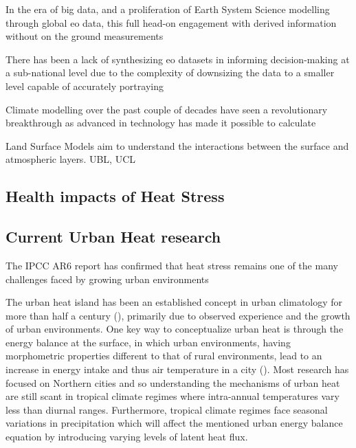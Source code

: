 In the era of big data, and a proliferation of Earth System Science modelling through global \Gls{eo} data, this full head-on engagement with derived information without on the ground measurements  

There has been a lack of synthesizing \Gls{eo} datasets in informing decision-making at a sub-national level due to the complexity of downsizing the data to a smaller level capable of accurately portraying 


Climate modelling over the past couple of decades have seen a revolutionary breakthrough as advanced in technology has made it possible to calculate 

Land Surface Models aim to understand the interactions between the surface and atmospheric layers.
UBL, UCL



\subsection{Health impacts of Heat Stress}



\subsection{Current Urban Heat research}
The IPCC AR6 report has confirmed that heat stress remains one of the many challenges faced by growing urban environments

The urban heat island has been an established concept in urban climatology for more than half a century (\cite{oke_1973}), primarily due to observed experience and the growth of urban environments. One key way to conceptualize urban heat is through the energy balance at the surface, in which urban environments, having morphometric properties different to that of rural environments, lead to an increase in energy intake and thus air temperature in a city (\cite{urban_energy_balance}). Most research has focused on Northern cities and so understanding the mechanisms of urban heat are still scant in tropical climate regimes where intra-annual temperatures vary less than diurnal ranges. Furthermore, tropical climate regimes face seasonal variations in precipitation which will affect the mentioned urban energy balance equation by introducing varying levels of latent heat flux.

